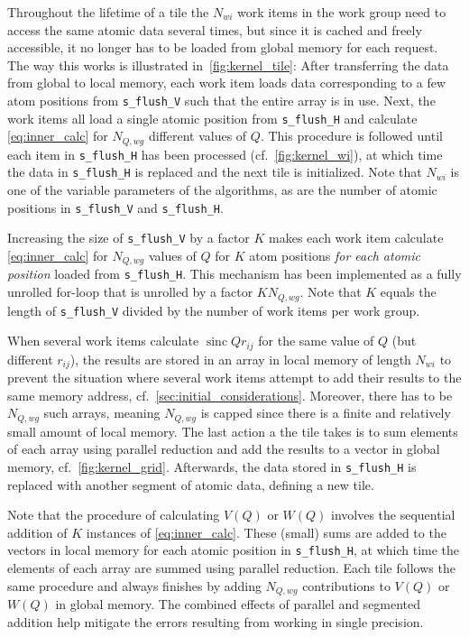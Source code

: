 \documentclass[11pt,twoside]{report}
\begin{document}
\indent Throughout the lifetime of a tile the $N_{wi}$ work items in the work group need to access the same atomic data several times, but since it is cached and freely accessible, it no longer has to be loaded from global memory for each request. The way this works is illustrated in~\cref{fig:kernel_tile}: After transferring the data from global to local memory, each work item loads data corresponding to a few atom positions from {\tt s\_flush\_V} such that the entire array is in use. Next, the work items all load a single atomic position from {\tt s\_flush\_H} and calculate \cref{eq:inner_calc} for $N_{Q,wg}$ different values of $Q$. This procedure is followed until each item in {\tt s\_flush\_H} has been processed (cf.~\cref{fig:kernel_wi}), at which time the data in {\tt s\_flush\_H} is replaced and the next tile is initialized.  Note that $N_{wi}$ is one of the variable parameters of the algorithms, as are the number of atomic positions in {\tt s\_flush\_V} and  {\tt s\_flush\_H}.  %

\indent Increasing the size of {\tt s\_flush\_V} by a factor $K$ makes each work item calculate \cref{eq:inner_calc} for $N_{Q,wg}$ values of $Q$ for $K$ atom positions {\it for each atomic position} loaded from {\tt s\_flush\_H}. This mechanism has been implemented as a fully unrolled for-loop that is unrolled by a factor $KN_{Q,wg}$.  Note that $K$ equals the length of {\tt s\_flush\_V} divided by the number of work items per work group.

\indent When several work items calculate $\operatorname{sinc}{Qr_{ij}}$ for the same value of $Q$ (but different $r_{ij}$), the results are stored in an array in local memory of length $N_{wi}$ to prevent the situation where several work items attempt to add their results to the same memory address, cf.~\cref{sec:initial_considerations}. Moreover, there has to be $N_{Q,wg}$ such arrays, meaning  $N_{Q,wg}$ is capped since there is a finite and relatively small amount of local memory. The last action a the tile takes is to sum elements of each array using parallel reduction and add the results to a vector in global memory, cf.~\cref{fig:kernel_grid}. Afterwards, the data stored in {\tt s\_flush\_H} is replaced with another segment of atomic data, defining a new tile.

\indent Note that the procedure of calculating $V(Q)$ or $W(Q)$ involves the sequential addition of $K$ instances of \cref{eq:inner_calc}. These (small) sums are added to the vectors in local memory for each atomic position in {\tt s\_flush\_H}, at which time  the elements of each array are summed using parallel reduction. Each tile follows the same procedure and always finishes by adding $N_{Q,wg}$ contributions to $V(Q)$ or $W(Q)$ in global memory. The combined effects of parallel and segmented addition help mitigate the errors resulting from working in single precision.
\end{document}
